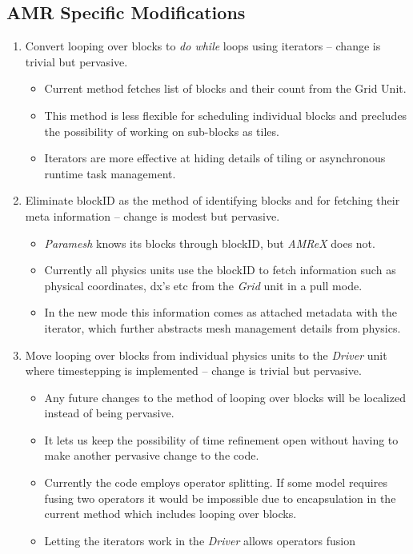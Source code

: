 \documentclass{article}
\newcommand{\amrex}{{\it AMReX}\xspace}
\newcommand{\paramesh}{{\it Paramesh}\xspace}
\newcommand{\grid}{{\it Grid}\xspace}
\newcommand{\driver}{{\it Driver}\xspace}
\begin{document}
\subsection{AMR Specific Modifications}
\label{sec:amr}
\begin{enumerate}
\item Convert looping over blocks to {\it do while} loops using
iterators -- change is trivial but pervasive.
\begin{itemize}
\item Current method fetches list of blocks and their count from the Grid Unit.
\item This method is less flexible for scheduling individual blocks
and precludes the possibility of working on sub-blocks as tiles.
\item Iterators are more effective at hiding details of tiling or
asynchronous runtime task management. 
\end{itemize}
\item Eliminate blockID as the method of identifying blocks and for
fetching their meta information -- change is modest but pervasive.
\begin{itemize}
\item \paramesh knows its blocks through blockID, but \amrex does not.
\item Currently all physics units use the blockID to fetch information
such as physical coordinates, dx's etc from the \grid unit in a pull
mode. 
\item In the new mode this information comes as attached metadata with
the iterator, which further abstracts mesh management details from physics.
\end{itemize}
\item Move looping over blocks from individual physics units to the
\driver unit where timestepping is implemented -- change is trivial
but pervasive.
\begin{itemize}
\item Any future changes to the method of looping over blocks will be localized instead
of being pervasive.
\item It lets us keep the possibility of time refinement open without
having to make another pervasive change to the code.
\item Currently the code employs operator splitting. If some model
requires fusing two operators it would be impossible due to
encapsulation in the current method which includes looping over blocks.
\item Letting the iterators work in the \driver allows operators fusion

\end{itemize}
\end{enumerate}
\end{document}

